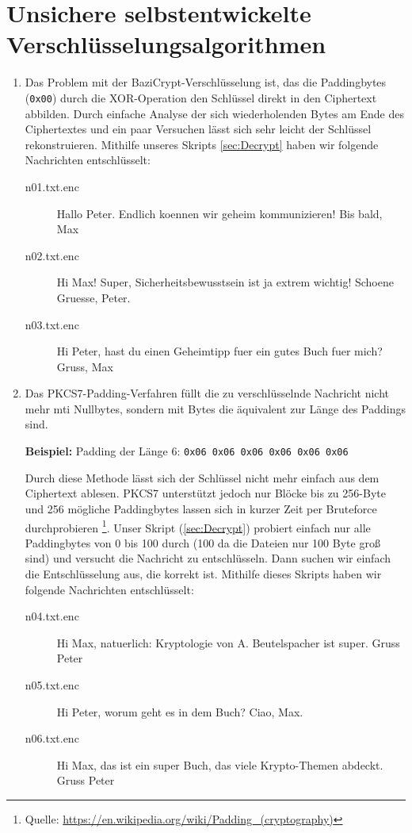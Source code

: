\documentclass[a4paper,12bpt]{scrartcl}
\begin{document}
\section{Unsichere selbstentwickelte Verschlüsselungsalgorithmen}
\label{sec:crypto}

\begin{enumerate}
    \item[\bfseries 1.]
        Das Problem mit der BaziCrypt-Verschlüsselung ist, das die Paddingbytes (\texttt{0x00})
        durch die XOR-Operation den Schlüssel direkt in den Ciphertext abbilden. Durch einfache
        Analyse der sich wiederholenden Bytes am Ende des Ciphertextes und ein paar Versuchen
        lässt sich sehr leicht der Schlüssel rekonstruieren. Mithilfe unseres Skripts \ref{sec:Decrypt}
        haben wir folgende Nachrichten entschlüsselt:
        \begin{description}
            \item[n01.txt.enc] Hallo Peter. Endlich koennen wir geheim kommunizieren! Bis bald, Max
            \item[n02.txt.enc] Hi Max! Super, Sicherheitsbewusstsein ist ja extrem wichtig! Schoene Gruesse, Peter.
            \item[n03.txt.enc] Hi Peter, hast du einen Geheimtipp fuer ein gutes Buch fuer mich? Gruss, Max
        \end{description}
    \item[\bfseries 2/3.]
        Das PKCS7-Padding-Verfahren füllt die zu verschlüsselnde Nachricht nicht mehr mti
        Nullbytes, sondern mit Bytes die äquivalent zur Länge des Paddings sind.

        \textbf{Beispiel:} Padding der Länge 6: \texttt{0x06 0x06 0x06 0x06 0x06 0x06}

        Durch diese Methode lässt sich der Schlüssel nicht mehr einfach aus dem Ciphertext
        ablesen. PKCS7 unterstützt jedoch nur Blöcke bis zu 256-Byte und 256 mögliche Paddingbytes
        lassen sich in kurzer Zeit per Bruteforce durchprobieren
        \footnote{Quelle: \url{https://en.wikipedia.org/wiki/Padding_(cryptography)}}. Unser Skript (\ref{sec:Decrypt})
        probiert einfach nur alle Paddingbytes von 0 bis 100 durch (100 da die Dateien nur 100 Byte
        groß sind) und versucht die Nachricht zu entschlüsseln. Dann suchen wir einfach die
        Entschlüsselung aus, die korrekt ist. Mithilfe dieses Skripts haben wir folgende Nachrichten
        entschlüsselt:
        \begin{description}
            \item[n04.txt.enc] Hi Max, natuerlich: Kryptologie von A. Beutelspacher ist super. Gruss Peter
            \item[n05.txt.enc] Hi Peter, worum geht es in dem Buch? Ciao, Max.
            \item[n06.txt.enc] Hi Max, das ist ein super Buch, das viele Krypto-Themen abdeckt. Gruss Peter
        \end{description}
\end{enumerate}
\end{document}
